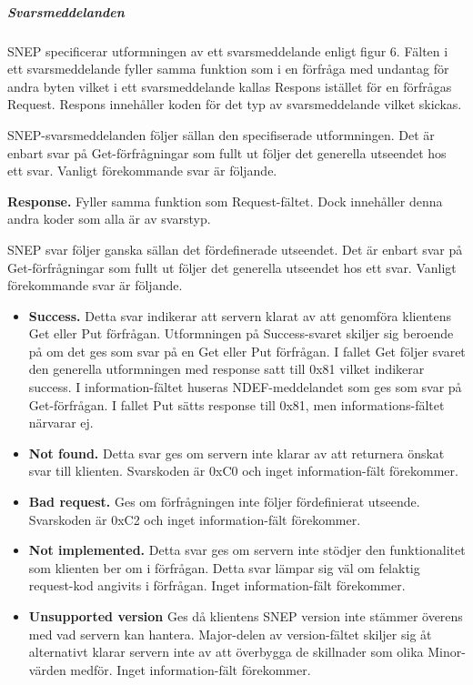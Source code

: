 \documentclass[11pt]{article}
\begin{document}

\subparagraph{Svarsmeddelanden}
SNEP specificerar utformningen av ett svarsmeddelande enligt figur 6. Fälten i ett svarsmeddelande fyller samma funktion som i en förfråga med undantag för andra byten vilket i ett svarsmeddelande kallas Respons istället för en förfrågas Request. Respons innehåller koden för det typ av svarsmeddelande vilket skickas.



SNEP-svarsmeddelanden följer sällan den specifiserade utformningen. Det är enbart svar på Get-förfrågningar som fullt ut följer det generella utseendet hos ett svar. Vanligt förekommande svar är följande.

\textbf{Response.} Fyller samma funktion som Request-fältet. Dock innehåller denna andra koder som alla är av svarstyp.

SNEP svar följer ganska sällan det fördefinerade utseendet. Det är enbart svar på Get-förfrågningar som fullt ut följer det generella utseendet hos ett svar. Vanligt förekommande svar är följande.

\begin{itemize}
\item \textbf{Success.} Detta svar indikerar att servern klarat av att genomföra klientens Get eller Put förfrågan. Utformningen på Success-svaret skiljer sig beroende på om det ges som svar på en Get eller Put förfrågan. I fallet Get följer svaret den generella utformningen med response satt till 0x81 vilket indikerar success. I information-fältet huseras NDEF-meddelandet som ges som svar på Get-förfrågan. I fallet Put sätts response till 0x81, men informations-fältet närvarar ej.
\item \textbf{Not found.} Detta svar ges om servern inte klarar av att returnera önskat svar till klienten. Svarskoden är 0xC0 och inget information-fält förekommer.
\item \textbf{Bad request.} Ges om förfrågningen inte följer fördefinierat utseende. Svarskoden är 0xC2 och inget information-fält förekommer.
\item \textbf{Not implemented.} Detta svar ges om servern inte stödjer den funktionalitet som klienten ber om i förfrågan. Detta svar lämpar sig väl om felaktig request-kod angivits i förfrågan. Inget information-fält förekommer.
\item \textbf{Unsupported version} Ges då klientens SNEP version inte stämmer överens med vad servern kan hantera. Major-delen av version-fältet skiljer sig åt alternativt klarar servern inte av att överbygga de skillnader som olika Minor-värden medför. Inget information-fält förekommer.
\end{itemize}
\end{document}
